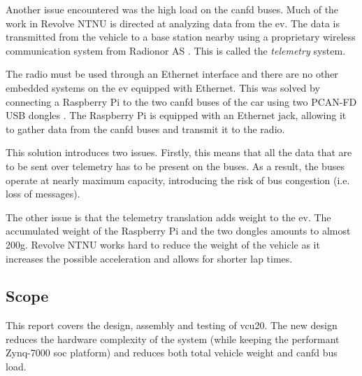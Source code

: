 Another issue encountered was the high load on the \acrfull{canfd} buses. Much of the work in Revolve NTNU is directed at analyzing data from the \acrshort{ev}. The data is transmitted from the vehicle to a base station nearby using a proprietary wireless communication system from Radionor AS \cite{radionor}. This is called the \emph{telemetry} system.

The radio must be used through an Ethernet interface and there are no other embedded systems on the \acrshort{ev} equipped with Ethernet. This was solved by connecting a Raspberry Pi \cite{rpi} to the two \acrshort{canfd} buses of the car using two PCAN-FD USB dongles \cite{pcan}. The Raspberry Pi is equipped with an Ethernet jack, allowing it to gather data from the \acrshort{canfd} buses and transmit it to the radio.

This solution introduces two issues. Firstly, this means that all the data that are to be sent over telemetry has to be present on the buses. As a result, the buses operate at nearly maximum capacity, introducing the risk of bus congestion (i.e. loss of messages).

The other issue is that the telemetry translation adds weight to the \acrshort{ev}. The accumulated weight of the Raspberry Pi and the two dongles amounts to almost 200\si{\gram}. Revolve NTNU works hard to reduce the weight of the vehicle as it increases the possible acceleration and allows for shorter lap times.


\subsection{Scope}

This report covers the design, assembly and testing of \acrfull{vcu20}. The new design reduces the hardware complexity of the system (while keeping the performant Zynq-7000 \acrshort{soc} platform) and reduces both total vehicle weight and \acrshort{canfd} bus load. 






